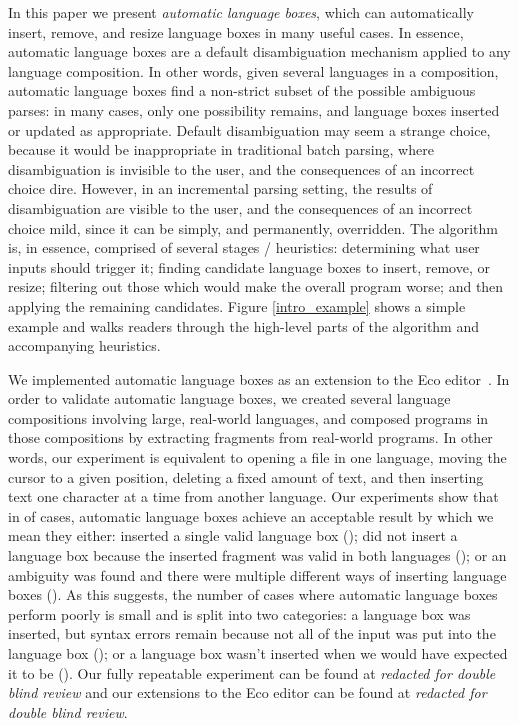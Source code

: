 \documentclass[sigplan,screen]{acmart}\settopmatter{printfolios=true,printccs=false,printacmref=false}
\begin{document}
In this paper we present \emph{automatic language boxes}, which can
automatically insert, remove, and resize language boxes in many useful cases.
In essence, automatic language boxes are a default disambiguation mechanism
applied to any language composition. In other words, given several languages in
a composition, automatic language boxes find a non-strict subset of the
possible ambiguous parses: in many cases, only one possibility remains, and
language boxes inserted or updated as appropriate. Default disambiguation may
seem a strange choice, because it would be inappropriate in traditional batch
parsing, where disambiguation is invisible to the user, and the consequences of
an incorrect choice dire. However, in an incremental parsing setting, the
results of disambiguation are visible to the user, and the consequences of an
incorrect choice mild, since it can be simply, and permanently, overridden. The
algorithm is, in essence, comprised of several stages / heuristics: determining what user
inputs should trigger it; finding candidate language boxes to insert, remove,
or resize; filtering out those which would make the overall program worse; and
then applying the remaining candidates. Figure \ref{intro_example} shows a
simple example and walks readers through the high-level parts of the algorithm
and accompanying heuristics.

We implemented automatic language boxes as an extension to the Eco
editor~\cite{diekmann14eco}. In order to validate automatic language boxes, we
created several language compositions involving large, real-world languages,
and composed programs in those compositions by extracting fragments from real-world programs.
In other words, our experiment is equivalent to opening a file
in one language, moving the cursor to a given position, deleting a fixed amount
of text, and then inserting text one character at a time from another language.
 Our experiments show that in \validalloverall of cases, automatic language boxes achieve an
acceptable result by which we mean they either: inserted a single valid
language box (\breakdownallvalid); did not insert a language box because the
inserted fragment was valid in both languages (\breakdownallnovalid); or an ambiguity
was found and there were multiple different ways of inserting language boxes
(\breakdownallnomulti). As this suggests, the number of cases where automatic
language boxes perform poorly is small and is split into two categories: a
language box was inserted, but syntax errors remain because not all of the
input was put into the language box (\breakdownallinvalid); or a language box wasn't
inserted when we would have expected it to be (\breakdownallnoerror). Our fully
repeatable experiment can be found at \emph{redacted for double blind review}
and our extensions to the Eco editor can be found at \emph{redacted for double
blind review}.
\end{document}
